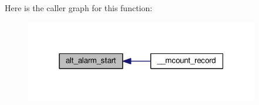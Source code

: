 Here is the caller graph for this function\+:
\nopagebreak
\begin{figure}[H]
\begin{center}
\leavevmode
\includegraphics[width=289pt]{d3/d33/alt__alarm__start_8c_a2335119470ec26f00044b77dc1e3ad9c_icgraph}
\end{center}
\end{figure}


